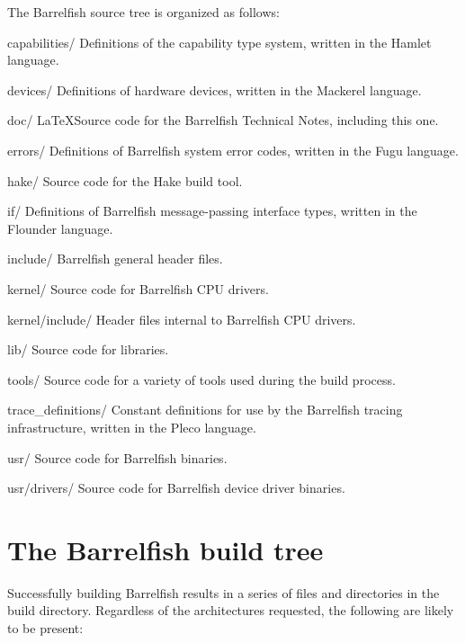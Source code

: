 \documentclass[a4paper,twoside]{report} %
\begin{document}
The Barrelfish source tree is organized as follows:
\begin{dirlist}
\item[capabilities/] Definitions of the capability type system,
  written in the Hamlet language.
\item[devices/] Definitions of hardware devices, written in the
  Mackerel language. 
\item[doc/] \LaTeX Source code for the Barrelfish Technical Notes, including
  this one.
\item[errors/] Definitions of Barrelfish system error codes, written
  in the Fugu language. 
\item[hake/] Source code for the Hake build tool.
\item[if/] Definitions of Barrelfish message-passing interface types,
  written in the Flounder language. 
\item[include/] Barrelfish general header files.
\item[kernel/] Source code for Barrelfish CPU drivers.
\item[kernel/include/] Header files internal to Barrelfish CPU drivers.
\item[lib/] Source code for libraries. 
\item[tools/] Source code for a variety of tools used during the build
  process. 
\item[trace\_definitions/] Constant definitions for use by the
  Barrelfish tracing infrastructure, written in the Pleco language. 
\item[usr/] Source code for Barrelfish binaries. 
\item[usr/drivers/] Source code for Barrelfish device driver binaries.
\end{dirlist}


\chapter{The Barrelfish build tree}\label{chap:buildtree}

Successfully building Barrelfish results in a series of files and
directories in the build directory.  Regardless of the architectures
requested, the following are likely to be present:
\end{document}
